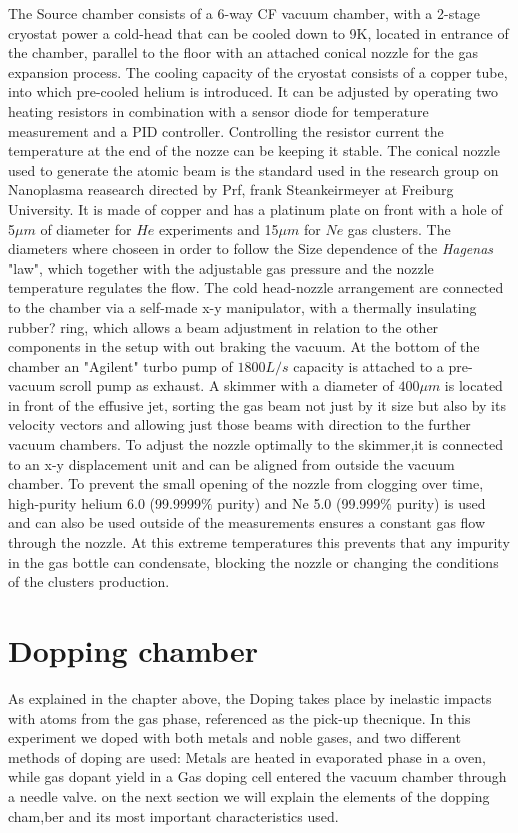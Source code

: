 The Source chamber consists of a 6-way CF vacuum chamber, with a 2-stage cryostat power a cold-head that can be cooled down to 9K, located in entrance of the chamber, parallel to the floor with an attached conical nozzle for the gas expansion process. The cooling capacity of the cryostat  consists of a copper tube, into which pre-cooled helium is introduced. It can be adjusted by operating two heating resistors in combination with a sensor diode for temperature measurement and a PID controller. Controlling the resistor current the temperature at the end of the nozze can be keeping it stable. The conical nozzle used to generate the atomic beam is the standard used in the research group on Nanoplasma reasearch directed by Prf, frank Steankeirmeyer at Freiburg University.  It is made of copper and has a platinum plate on front with a hole of 5$\mu m$ of diameter for $He$ experiments and 15$\mu m$ for $Ne$ gas clusters. The diameters where choseen in order to follow the Size dependence of the \textit{Hagenas} "law",  which together with the adjustable gas pressure and the nozzle temperature regulates the flow.
The cold head-nozzle arrangement are connected to the chamber via a self-made x-y manipulator,  with a thermally insulating rubber? ring, which allows a beam adjustment in relation to the other components in the setup with out braking the vacuum. At the bottom of the chamber an "Agilent" turbo pump of $1800 L/s$ capacity is attached to a pre-vacuum scroll pump as exhaust.
A skimmer with a diameter of $400\mu m$ is located in front of the effusive jet, sorting the gas beam not just by it size but also by its velocity vectors and allowing just those beams with direction to the further vacuum chambers. To adjust the nozzle optimally to the skimmer,it is connected to an x-y displacement unit and can be aligned from outside the vacuum chamber. To prevent the small opening of the nozzle from clogging over time, high-purity helium 6.0 (99.9999$\%$ purity) and Ne 5.0 (99.999$\%$ purity)  is used and can also be used outside of the measurements ensures a constant gas flow through the nozzle. At this extreme temperatures this prevents that any impurity in the gas bottle can  condensate, blocking the nozzle or changing the conditions of the clusters production. 

\section{Dopping chamber}

As explained in the chapter above, the Doping takes place by inelastic impacts with atoms from the gas phase, referenced as the pick-up thecnique. In this experiment we doped with both metals and noble gases, and two different methods of doping are used: Metals are heated in evaporated phase in a oven, while gas dopant yield in a Gas doping cell entered the vacuum chamber through a needle valve. on the next section we will explain the elements of the dopping cham,ber and its most important characteristics used.

